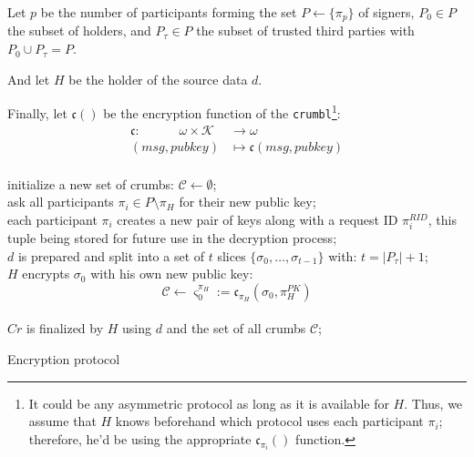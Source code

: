 \documentclass[twoside,twocolumn]{article}
\theoremstyle{definition}
\theoremstyle{remark}
\begin{document}
\vspace{1em} %

Let $p$ be the number of participants forming the set $P \gets \{ \pi_p\}$ of signers, $P_0 \in P$ the subset of holders, and $P_\tau \in P$ the subset 
of trusted third parties with $P_0 \cup P_\tau = P$.

And let $H$ be the holder of the source data $d$.

Finally, let $\mathfrak{c}()$ be the encryption function of the \texttt{crumbl}\footnote{It could be any asymmetric protocol as long as it is available 
for $H$. Thus, we assume that $H$ knows beforehand which protocol uses each participant $\pi_i$; therefore, he'd be using the appropriate 
$\mathfrak{c}_{\pi_i}()$ function.}:
\begin{equation}
    \label{eq:encrypt}
    \begin{array}{rl}
        \mathfrak{c}: \qquad \quad \omega \times \mathcal{K} &\to \omega \\
                (msg, pubkey) &\mapsto \mathfrak{c}(msg, pubkey) \\
    \end{array}
\end{equation}
\begin{algorithm}
    initialize a new set of crumbs: $\mathcal{C} \gets \emptyset$; \\
    ask all participants $\pi_i \in P \setminus {\pi_H}$ for their new public key; \\
    each participant $\pi_i$ creates a new pair of keys along with a request ID $\pi_i^{RID}$, this tuple being stored for future use in the decryption 
        process; \\
    $d$ is prepared and split into a set of $t$ slices $\{ \sigma_0, \dots, \sigma_{t-1} \}$ with: $t = |P_\tau| + 1$; \\
    $H$ encrypts $\sigma_0$ with his own new public key: $$
        \mathcal{C} \gets \varsigma_0^{\pi_H} := \mathfrak{c}_{\pi_H}(\sigma_0, \pi_H^{PK})
    $$ \\
    $Cr$ is finalized by $H$ using $d$ and the set of all crumbs $\mathcal{C}$; \\
    \caption{Encryption protocol}
    \label{algo:encryption}
\end{algorithm}
\end{document}
